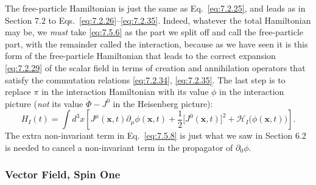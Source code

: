The free-particle Hamiltonian is just the same as Eq.~\eqref{eq:7.2.25}, and leads
as in Section 7.2 to Eqs.~\eqref{eq:7.2.26}--\eqref{eq:7.2.35}. Indeed, whatever the total
Hamiltonian may be, we \emph{must} take \eqref{eq:7.5.6} as the part we split off and
call the free-particle part, with the remainder called the interaction,
because as we have seen it is this form of the free-particle Hamiltonian that
leads to the correct expansion \eqref{eq:7.2.29} of the scalar field in terms of
creation and annihilation operators that satisfy the commutation relations
\eqref{eq:7.2.34}, \eqref{eq:7.2.35}. The last step is to replace $\pi$ in the interaction
Hamiltonian with its value $\dot\phi$ in the interaction picture (\emph{not}
its value $\dot\Phi-J^0$ in the Heisenberg picture):
\begin{equation}
H_I(t)=\int d^3x\left[J^\mu(\mathbf x,t)\partial_\mu\phi(\mathbf x,t)
+\frac12\bigl[J^0(\mathbf x,t)\bigr]^2
+\mathcal H_I\bigl(\phi(\mathbf x,t)\bigr)\right].
\tag{7.5.8}\label{eq:7.5.8}
\end{equation}
The extra non-invariant term in Eq.~\eqref{eq:7.5.8} is just what we saw in Section
6.2 is needed to cancel a non-invariant term in the propagator of
$\partial_0\phi$.

\subsubsection*{Vector Field, Spin One}


